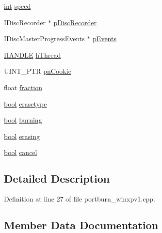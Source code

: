 \begin{DoxyCompactItemize}
\item 
\hyperlink{xmltok_8h_a5a0d4a5641ce434f1d23533f2b2e6653}{int} \hyperlink{struct_p_b_handlev1_a3dd77c658bf68f31fe0a95d22767c347}{speed}
\item 
I\+Disc\+Recorder $\ast$ \hyperlink{struct_p_b_handlev1_aacaa84251424c2330ae867bd3df58a64}{p\+Disc\+Recorder}
\item 
I\+Disc\+Master\+Progress\+Events $\ast$ \hyperlink{struct_p_b_handlev1_a10b80fde92dc500d0f8f51dc5eca0b53}{p\+Events}
\item 
\hyperlink{_sound_touch_d_l_l_8h_aa8c0374618b33785ccb02f74bcfebc46}{H\+A\+N\+D\+LE} \hyperlink{struct_p_b_handlev1_a7cfdfb5fda4a3b11944a895bc1798e73}{h\+Thread}
\item 
U\+I\+N\+T\+\_\+\+P\+TR \hyperlink{struct_p_b_handlev1_a8400859e34f06cb4b4597039d9ed2463}{pn\+Cookie}
\item 
float \hyperlink{struct_p_b_handlev1_a3cd1d6da80c3cb59614f732e4e7607be}{fraction}
\item 
\hyperlink{mac_2config_2i386_2lib-src_2libsoxr_2soxr-config_8h_abb452686968e48b67397da5f97445f5b}{bool} \hyperlink{struct_p_b_handlev1_ad9be7e9a283d8a47c1192471c90e04d0}{erasetype}
\item 
\hyperlink{mac_2config_2i386_2lib-src_2libsoxr_2soxr-config_8h_abb452686968e48b67397da5f97445f5b}{bool} \hyperlink{struct_p_b_handlev1_a4e0c7db95644de79506ae3c78f4c0deb}{burning}
\item 
\hyperlink{mac_2config_2i386_2lib-src_2libsoxr_2soxr-config_8h_abb452686968e48b67397da5f97445f5b}{bool} \hyperlink{struct_p_b_handlev1_a5fdebe4b9efae64d965fc5075f8949ae}{erasing}
\item 
\hyperlink{mac_2config_2i386_2lib-src_2libsoxr_2soxr-config_8h_abb452686968e48b67397da5f97445f5b}{bool} \hyperlink{struct_p_b_handlev1_a7376ee290aef4efc91f3e9dcb52f9678}{cancel}
\end{DoxyCompactItemize}


\subsection{Detailed Description}


Definition at line 27 of file portburn\+\_\+winxpv1.\+cpp.



\subsection{Member Data Documentation}
